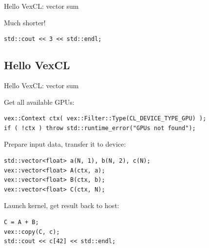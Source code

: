 \documentclass[@BEAMER_OPTIONS@]{beamer}
\begin{document}

\begin{frame}[fragile]{Hello VexCL: vector sum}
    \begin{exampleblock}{Much shorter!}
        \begin{lstlisting}
std::cout << 3 << std::endl;
        \end{lstlisting}
    \end{exampleblock}
\end{frame}

\note{ }

\subsection{Hello VexCL}

\begin{frame}[fragile]{Hello VexCL: vector sum}
    \begin{exampleblock}{Get all available GPUs:}
        \begin{lstlisting}
vex::Context ctx( vex::Filter::Type(CL_DEVICE_TYPE_GPU) );
if ( !ctx ) throw std::runtime_error("GPUs not found");
        \end{lstlisting}
    \end{exampleblock}
    \begin{exampleblock}{Prepare input data, transfer it to device:}
        \begin{lstlisting}[firstnumber=last]
std::vector<float> a(N, 1), b(N, 2), c(N);
vex::vector<float> A(ctx, a);
vex::vector<float> B(ctx, b);
vex::vector<float> C(ctx, N);
        \end{lstlisting}
    \end{exampleblock}
    \begin{exampleblock}{Launch kernel, get result back to host:}
        \begin{lstlisting}[firstnumber=last]
C = A + B;
vex::copy(C, c);
std::cout << c[42] << std::endl;
        \end{lstlisting}
    \end{exampleblock}
\end{frame}
\end{document}

